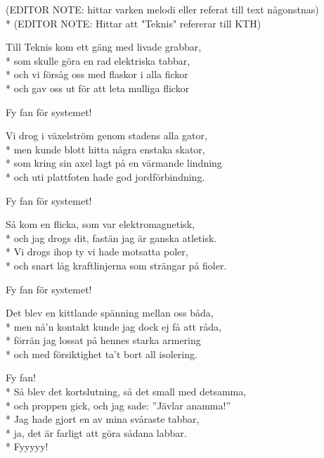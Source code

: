 \begin{SongText}[Laborationsvisan]
    \begin{SongInfo}
        (EDITOR NOTE: hittar varken melodi eller referat till text någonstnas)\\*%
        (EDITOR NOTE: Hittar att "Teknis" refererar till KTH)
    \end{SongInfo}
    \begin{SongVerse}
        Till Teknis kom ett gäng med livade grabbar,\\*%
        som skulle göra en rad elektriska tabbar,\\*%
        och vi försåg oss med flaskor i alla fickor\\*%
        och gav oss ut för att leta mulliga flickor
    \end{SongVerse}
    \begin{SongVerse}
        Fy fan för systemet!
    \end{SongVerse}
    \begin{SongVerse}
        Vi drog i växelström genom stadens alla gator,\\*%
        men kunde blott hitta några enstaka skator,\\*%
        som kring sin axel lagt på en värmande lindning\\*%
        och uti plattfoten hade god jordförbindning.
    \end{SongVerse}
    \begin{SongVerse}
        Fy fan för systemet!
    \end{SongVerse}
    \begin{SongVerse}
        Så kom en flicka, som var elektromagnetisk,\\*%
        och jag drogs dit, fastän jag är ganska atletisk.\\*%
        Vi drogs ihop ty vi hade motsatta poler,\\*%
        och snart låg kraftlinjerna som strängar på fioler.
    \end{SongVerse}
    \begin{SongVerse}
        Fy fan för systemet!
    \end{SongVerse}
    \begin{SongVerse}
        Det blev en kittlande spänning mellan oss båda,\\*%
        men nå’n kontakt kunde jag dock ej få att råda,\\*%
        förrän jag lossat på hennes starka armering\\*%
        och med försiktighet ta’t bort all isolering.
    \end{SongVerse}
    \begin{SongVerse}
        Fy fan!\\*%
        Så blev det kortslutning, så det small med detsamma,\\*%
        och proppen gick, och jag sade: ”Jävlar anamma!”\\*%
        Jag hade gjort en av mina svåraste tabbar,\\*%
        ja, det är farligt att göra sådana labbar.\\*%
        Fyyyyy!
    \end{SongVerse}
\end{SongText}
